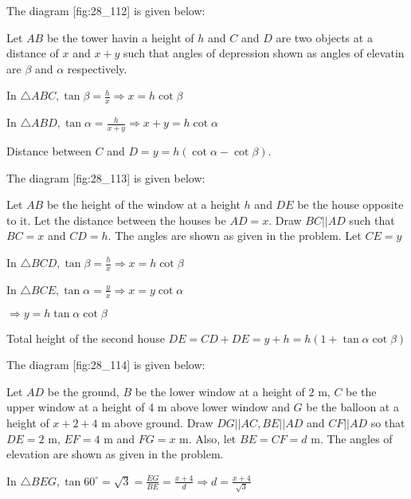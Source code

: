 \item The diagram [fig:28_112] is given below:

  \startplacefigure[reference=fig:28_112]
    \externalfigure[28_112.pdf]
  \stopplacefigure

  Let $AB$ be the tower havin a height of $h$ and $C$ and $D$ are two objects at a distance of $x$
  and $x + y$ such that angles of depression shown as angles of elevatin are $\beta$ and $\alpha$ respectively.

  In $\triangle ABC, \tan\beta = \frac{h}{x} \Rightarrow x = h\cot\beta$

  In $\triangle ABD, \tan\alpha = \frac{h}{x + y} \Rightarrow x + y = h\cot\alpha$

  Distance between $C$ and $D = y = h(\cot\alpha - \cot\beta)$.

\item The diagram [fig:28_113] is given below:

  \startplacefigure[reference=fig:28_113]
    \externalfigure[28_113.pdf]
  \stopplacefigure

  Let $AB$ be the height of the window at a height $h$ and $DE$ be the house opposite to it. Let the distance
  between the houses be $AD = x$. Draw $BC||AD$ such that $BC = x$ and $CD = h$. The angles are shown as
  given in the problem. Let $CE = y$

  In $\triangle BCD, \tan\beta = \frac{h}{x} \Rightarrow x = h\cot\beta$

  In $\triangle BCE, \tan\alpha = \frac{y}{x} \Rightarrow x = y\cot\alpha$

  $\Rightarrow y = h\tan\alpha\cot\beta$

  Total height of the second house $DE = CD + DE = y + h = h(1 + \tan\alpha\cot\beta)$

\item The diagram [fig:28_114] is given below:

  \startplacefigure[reference=fig:28_114]
    \externalfigure[28_114.pdf]
  \stopplacefigure

  Let $AD$ be the ground, $B$ be the lower window at a height of $2$ m, $C$ be the upper window at a
  height of $4$ m above lower window and $G$ be the balloon at a height of $x + 2 + 4$ m above ground. Draw
  $DG||AC, BE||AD$ and $CF||AD$ so that $DE = 2$ m, $EF = 4$ m and $FG = x$ m. Also, let $BE
  = CF = d$ m. The angles of elevation are shown as given in the problem.

  In $\triangle BEG, \tan60^\circ = \sqrt{3} = \frac{EG}{BE} = \frac{x + 4}{d}\Rightarrow d = \frac{x + 4}{\sqrt{3}}$

